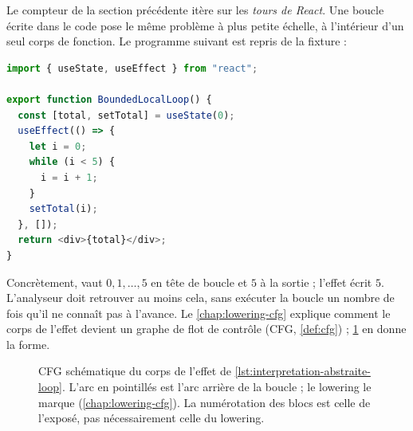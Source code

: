 Le compteur de la section précédente itère sur les \emph{tours de React}.
Une boucle écrite dans le code pose le même problème à plus petite échelle,
à l'intérieur d'un seul corps de fonction. Le programme suivant est repris de
la fixture  :

\begin{lstlisting}[language=TypeScript,caption={Une boucle bornée dans un effet (\file{/tmp/ch03/loop.tsx}, identique à \code{BoundedLocalLoop} de \file{tests/fixtures/widening.tsx})},label={lst:interpretation-abstraite-loop}]
import { useState, useEffect } from "react";

export function BoundedLocalLoop() {
  const [total, setTotal] = useState(0);
  useEffect(() => {
    let i = 0;
    while (i < 5) {
      i = i + 1;
    }
    setTotal(i);
  }, []);
  return <div>{total}</div>;
}
\end{lstlisting}

Concrètement,  vaut $0, 1, \dots, 5$ en tête de boucle et $5$ à la
sortie ; l'effet écrit $5$. L'analyseur doit retrouver au moins cela, sans
exécuter la boucle un nombre de fois qu'il ne connaît pas à l'avance. Le
\cref{chap:lowering-cfg} explique comment le corps de l'effet devient un
graphe de flot de contrôle (CFG, \cref{def:cfg}) ;
\cref{fig:interpretation-abstraite-cfg-loop} en donne la forme.

\begin{figure}[htbp]\centering
{}
\caption{CFG schématique du corps de l'effet de
\cref{lst:interpretation-abstraite-loop}. L'arc en pointillés est l'arc arrière
de la boucle ; le lowering le marque 
(\cref{chap:lowering-cfg}). La numérotation des blocs est celle de l'exposé,
pas nécessairement celle du lowering.}
\label{fig:interpretation-abstraite-cfg-loop}
\end{figure}

